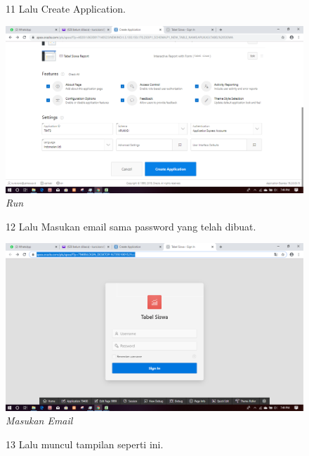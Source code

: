 \begin{enumerate}
\begin{figure}
\item[11] Lalu Create Application.
    \begin{center}
\includegraphics[scale=0.2]{figures/11.png}
    \caption{\textit{Run}}
        \end{center}
\label{gambar}
\end{figure}

\begin{figure}
\item[12] Lalu Masukan email sama password yang telah dibuat.

    \begin{center}
\includegraphics[scale=0.2]{figures/12.png}
    \caption{\textit{Masukan Email}}
        \end{center}
\label{gambar}
\end{figure}

\begin{figure}
\item[13] Lalu muncul tampilan seperti ini.


\end{figure}
\end{enumerate}
